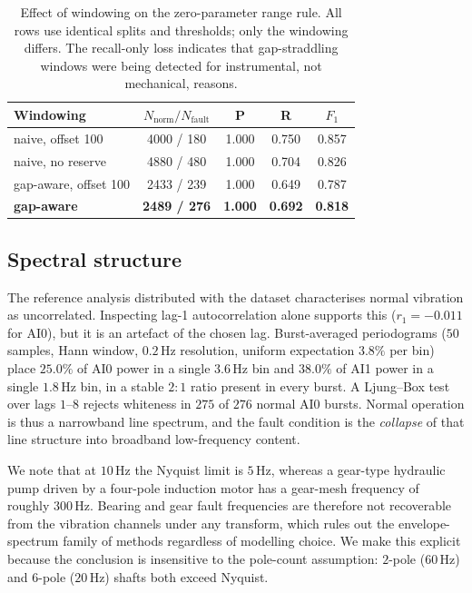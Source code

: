 \documentclass[twocolumn,10pt]{article}
\begin{document}
\begin{table}[t]
\centering\small
\caption{Effect of windowing on the zero-parameter range rule. All rows use
identical splits and thresholds; only the windowing differs. The recall-only
loss indicates that gap-straddling windows were being detected for
instrumental, not mechanical, reasons.}
\label{tab:windowing}
\begin{tabular}{lcccc}
\toprule
Windowing & $N_{\text{norm}}/N_{\text{fault}}$ & P & R & $F_1$ \\
\midrule
naive, offset 100 & 4000 / 180 & 1.000 & 0.750 & 0.857 \\
naive, no reserve & 4880 / 480 & 1.000 & 0.704 & 0.826 \\
gap-aware, offset 100 & 2433 / 239 & 1.000 & 0.649 & 0.787 \\
\textbf{gap-aware} & \textbf{2489 / 276} & \textbf{1.000} & \textbf{0.692} & \textbf{0.818} \\
\bottomrule
\end{tabular}
\end{table}

\subsection{Spectral structure}

The reference analysis distributed with the dataset characterises normal
vibration as uncorrelated. Inspecting lag-1 autocorrelation alone supports
this ($r_1 = -0.011$ for \textsf{AI0}), but it is an artefact of the chosen lag.
Burst-averaged periodograms ($50$ samples, Hann window, $0.2$\,Hz resolution,
uniform expectation $3.8\%$ per bin) place $25.0\%$ of \textsf{AI0} power in a
single $3.6$\,Hz bin and $38.0\%$ of \textsf{AI1} power in a single $1.8$\,Hz
bin, in a stable $2{:}1$ ratio present in every burst. A Ljung--Box test
\citep{ljung1978measure} over lags $1$--$8$ rejects whiteness in $275$ of $276$
normal \textsf{AI0} bursts. Normal operation is thus a narrowband line
spectrum, and the fault condition is the \emph{collapse} of that line structure
into broadband low-frequency content.

We note that at $10$\,Hz the Nyquist limit is $5$\,Hz, whereas a gear-type
hydraulic pump driven by a four-pole induction motor has a gear-mesh frequency
of roughly $300$\,Hz. Bearing and gear fault frequencies are therefore not
recoverable from the vibration channels under any transform, which rules out
the envelope-spectrum family of methods regardless of modelling choice. We make
this explicit because the conclusion is insensitive to the pole-count
assumption: $2$-pole ($60$\,Hz) and $6$-pole ($20$\,Hz) shafts both exceed
Nyquist.
\end{document}
